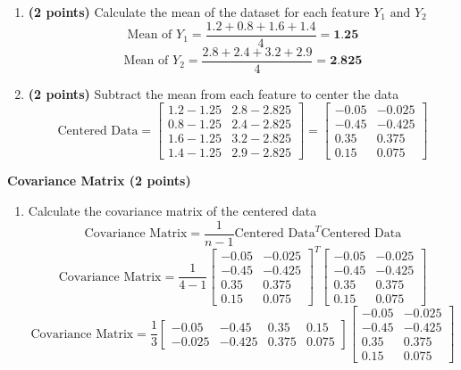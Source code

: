 \documentclass[a3paper,12pt]{extarticle} %
\begin{document}
\begin{enumerate}
\begin{enumerate}
        \item \textbf{(2 points)} Calculate the mean of the dataset for each feature \(Y_1 \text{ and } Y_2\)
        \[
        \text{Mean of } Y_1 = \frac{1.2 + 0.8 + 1.6 + 1.4}{4} = \textbf{1.25}
        \]
        \[
        \text{Mean of } Y_2 = \frac{2.8 + 2.4 + 3.2 + 2.9}{4} = \textbf{2.825}
        \]
        \item \textbf{(2 points)} Subtract the mean from each feature to center the data
        \[
        \text{Centered Data} = \begin{bmatrix}1.2 - 1.25 & 2.8 - 2.825\\0.8 - 1.25 & 2.4 - 2.825\\1.6 - 1.25 & 3.2 - 2.825\\1.4 - 1.25 & 2.9 - 2.825\end{bmatrix} = \begin{bmatrix}-0.05 & -0.025\\-0.45 & -0.425\\0.35 & 0.375\\0.15 & 0.075\end{bmatrix}
        \]
    \end{enumerate}
    \subitem \textbf{Covariance Matrix (2 points)}
    \begin{enumerate}
        \item Calculate the covariance matrix of the centered data
    \[
    \text{Covariance Matrix} = \frac{1}{n-1} \text{Centered Data}^T \text{Centered Data}
    \]
    \[
    \text{Covariance Matrix} = \frac{1}{4-1} \begin{bmatrix}-0.05 & -0.025\\-0.45 & -0.425\\0.35 & 0.375\\0.15 & 0.075\end{bmatrix}^T \begin{bmatrix}-0.05 & -0.025\\-0.45 & -0.425\\0.35 & 0.375\\0.15 & 0.075\end{bmatrix}
    \]
    \[
    \text{Covariance Matrix} = \frac{1}{3} \begin{bmatrix}-0.05 & -0.45 & 0.35 & 0.15\\-0.025 & -0.425 & 0.375 & 0.075\end{bmatrix} \begin{bmatrix}-0.05 & -0.025\\-0.45 & -0.425\\0.35 & 0.375\\0.15 & 0.075\end{bmatrix}
\]
\end{enumerate}
\end{enumerate}
\end{document}
